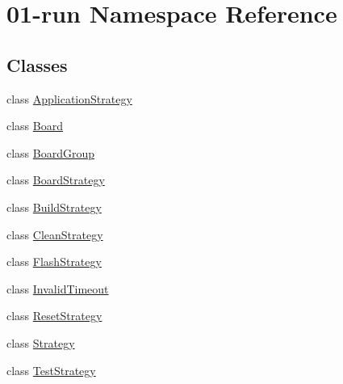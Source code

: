\hypertarget{namespace01-run}{}\section{01-\/run Namespace Reference}
\label{namespace01-run}
\subsection*{Classes}
\begin{DoxyCompactItemize}
\item 
class \hyperlink{class01-run_1_1ApplicationStrategy}{Application\+Strategy}
\item 
class \hyperlink{class01-run_1_1Board}{Board}
\item 
class \hyperlink{class01-run_1_1BoardGroup}{Board\+Group}
\item 
class \hyperlink{class01-run_1_1BoardStrategy}{Board\+Strategy}
\item 
class \hyperlink{class01-run_1_1BuildStrategy}{Build\+Strategy}
\item 
class \hyperlink{class01-run_1_1CleanStrategy}{Clean\+Strategy}
\item 
class \hyperlink{class01-run_1_1FlashStrategy}{Flash\+Strategy}
\item 
class \hyperlink{class01-run_1_1InvalidTimeout}{Invalid\+Timeout}
\item 
class \hyperlink{class01-run_1_1ResetStrategy}{Reset\+Strategy}
\item 
class \hyperlink{class01-run_1_1Strategy}{Strategy}
\item 
class \hyperlink{class01-run_1_1TestStrategy}{Test\+Strategy}
\end{DoxyCompactItemize}
